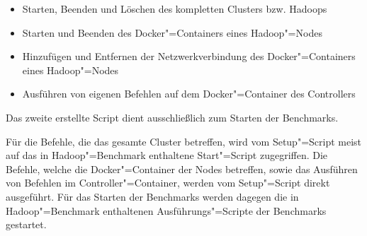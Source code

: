 \begin{itemize}
    \item Starten, Beenden und Löschen des kompletten Clusters bzw. Hadoops
    \item Starten und Beenden des Docker"=Containers eines Hadoop"=Nodes
    \item Hinzufügen und Entfernen der Netzwerkverbindung des Docker"=Containers eines Hadoop"=Nodes
    \item Ausführen von eigenen Befehlen auf dem Docker"=Container des Controllers
\end{itemize}

Das zweite erstellte Script dient ausschließlich zum Starten der Benchmarks.

Für die Befehle, die das gesamte Cluster betreffen, wird vom Setup"=Script meist auf das in Hadoop"=Benchmark enthaltene Start"=Script zugegriffen.
Die Befehle, welche die Docker"=Container der Nodes betreffen, sowie das Ausführen von Befehlen im Controller"=Container, werden vom Setup"=Script direkt ausgeführt.
Für das Starten der Benchmarks werden dagegen die in Hadoop"=Benchmark enthaltenen Ausführungs"=Scripte der Benchmarks gestartet.
